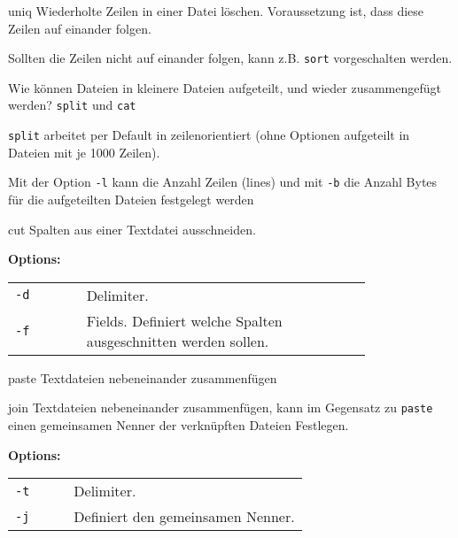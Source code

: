 \begin{flashcard}[Command]{uniq}
	Wiederholte Zeilen in einer Datei löschen. Voraussetzung ist, dass diese Zeilen auf einander folgen.
	
	Sollten die Zeilen nicht auf einander folgen, kann z.B. \texttt{sort} vorgeschalten werden.
\end{flashcard}

\begin{flashcard}[Command]{Wie können Dateien in kleinere Dateien aufgeteilt, und wieder zusammengefügt werden?}
	\texttt{split} und \texttt{cat}
	
	\begin{description}
		\item	\texttt{split} arbeitet per Default in zeilenorientiert (ohne Optionen aufgeteilt in Dateien mit je 1000 Zeilen). 
		
		\item	Mit der Option \texttt{-l} kann die Anzahl Zeilen (lines) und mit \texttt{-b} die Anzahl Bytes für die aufgeteilten Dateien festgelegt werden
	\end{description}
	
	
\end{flashcard}

\begin{flashcard}[Command]{cut}
	Spalten aus einer Textdatei ausschneiden.
	
	\textbf{Options:}
	
	\begin{tabular}{lp{0.8\linewidth}}
		\texttt{-d} & Delimiter.\\
		\texttt{-f} & Fields. Definiert welche Spalten ausgeschnitten werden sollen.\\
	\end{tabular}
\end{flashcard}

\begin{flashcard}[Command]{paste}
	Textdateien nebeneinander zusammenfügen
\end{flashcard}

\begin{flashcard}[Command]{join}
	Textdateien nebeneinander zusammenfügen, kann im Gegensatz zu \texttt{paste} einen gemeinsamen Nenner der verknüpften Dateien Festlegen.
	
	\textbf{Options:}
	
	\begin{tabular}{lp{0.8\linewidth}}
		\texttt{-t} & Delimiter.\\
		\texttt{-j} & Definiert den gemeinsamen Nenner.
	\end{tabular}
\end{flashcard}

